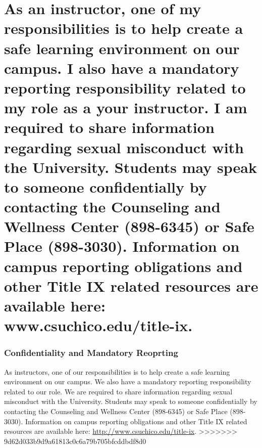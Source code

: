 \documentclass[11pt,]{article}
\begin{document}
\hypertarget{as-an-instructor-one-of-my-responsibilities-is-to-help-create-a-safe-learning-environment-on-our-campus.-i-also-have-a-mandatory-reporting-responsibility-related-to-my-role-as-a-your-instructor.-i-am-required-to-share-information-regarding-sexual-misconduct-with-the-university.-students-may-speak-to-someone-confidentially-by-contacting-the-counseling-and-wellness-center-898-6345-or-safe-place-898-3030.-information-on-campus-reporting-obligations-and-other-title-ix-related-resources-are-available-here-www.csuchico.edutitle-ix.}{%
\section{As an instructor, one of my responsibilities is to help create
a safe learning environment on our campus. I also have a mandatory
reporting responsibility related to my role as a your instructor. I am
required to share information regarding sexual misconduct with the
University. Students may speak to someone confidentially by contacting
the Counseling and Wellness Center (898-6345) or Safe Place (898-3030).
Information on campus reporting obligations and other Title IX related
resources are available here:
www.csuchico.edu/title-ix.}\label{as-an-instructor-one-of-my-responsibilities-is-to-help-create-a-safe-learning-environment-on-our-campus.-i-also-have-a-mandatory-reporting-responsibility-related-to-my-role-as-a-your-instructor.-i-am-required-to-share-information-regarding-sexual-misconduct-with-the-university.-students-may-speak-to-someone-confidentially-by-contacting-the-counseling-and-wellness-center-898-6345-or-safe-place-898-3030.-information-on-campus-reporting-obligations-and-other-title-ix-related-resources-are-available-here-www.csuchico.edutitle-ix.}}

\hypertarget{confidentiality-and-mandatory-reoprting-1}{%
\subsubsection{Confidentiality and Mandatory
Reoprting}\label{confidentiality-and-mandatory-reoprting-1}}

As instructors, one of our responsibilities is to help create a safe
learning environment on our campus. We also have a mandatory reporting
responsibility related to our role. We are required to share information
regarding sexual misconduct with the University. Students may speak to
someone confidentially by contacting the Counseling and Wellness Center
(898-6345) or Safe Place (898-3030). Information on campus reporting
obligations and other Title IX related resources are available here:
\url{http://www.csuchico.edu/title-ix}.
\textgreater{}\textgreater{}\textgreater{}\textgreater{}\textgreater{}\textgreater{}\textgreater{}
9d62d033b9d9a61813c0c6a79b705bfcddbdf8d0
\end{document}
